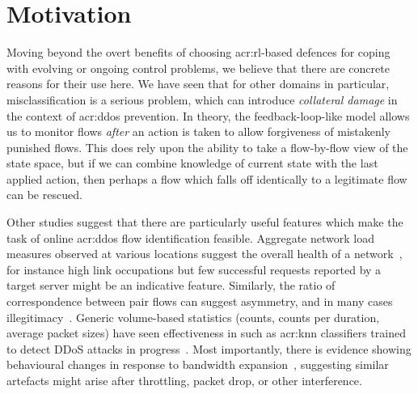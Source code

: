 \section{Motivation}\label{sec:ddos-motivation}
Moving beyond the overt benefits of choosing \gls{acr:rl}-based defences for coping with evolving or ongoing control problems, we believe that there are concrete reasons for their use here.
We have seen that for other domains in particular, misclassification is a serious problem, which can introduce \emph{collateral damage} in the context of \gls{acr:ddos} prevention.
In theory, the feedback-loop-like model allows us to monitor flows \emph{after} an action is taken to allow forgiveness of mistakenly punished flows.
This does rely upon the ability to take a flow-by-flow view of the state space, but if we can combine knowledge of current state with the last applied action, then perhaps a flow which falls off identically to a legitimate flow can be rescued.

Other studies suggest that there are particularly useful features which make the task of online \gls{acr:ddos} flow identification feasible.
Aggregate network load measures observed at various locations suggest the overall health of a network~\parencite{DBLP:journals/eaai/MalialisK15}, for instance high link occupations but few successful requests reported by a target server might be an indicative feature.
Similarly, the ratio of correspondence between pair flows can suggest asymmetry, and in many cases illegitimacy~\parencite{DBLP:conf/ndss/Rossow14}.
Generic volume-based statistics (counts, counts per duration, average packet sizes) have seen effectiveness in such as \gls{acr:knn} classifiers trained to detect DDoS attacks in progress~\parencite{DBLP:conf/dsn/LeeKSPY17}.
Most importantly, there is evidence showing behavioural changes in response to bandwidth expansion~\parencite{DBLP:conf/ndss/KangGS16}, suggesting similar artefacts might arise after throttling, packet drop, or other interference.

